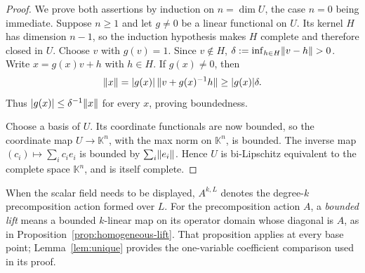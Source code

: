 \begin{proof}
We prove both assertions by induction on $n=\dim U$, the case $n=0$ being immediate. Suppose $n\ge1$ and let $g\ne0$
be a linear functional on $U$. Its kernel $H$ has dimension $n-1$, so the induction hypothesis makes $H$ complete
and therefore closed in $U$. Choose $v$ with $g(v)=1$. Since $v\notin H$,
$\delta:=\inf_{h\in H}\lVert v-h\rVert>0$. Write $x=g(x)v+h$ with $h\in H$. If $g(x)\ne0$, then
\[
\lVert x\rVert=\lvert g(x)\rvert\,\lVert v+g(x)^{-1}h\rVert\ge\lvert g(x)\rvert\delta.
\]
Thus $\lvert g(x)\rvert\le\delta^{-1}\lVert x\rVert$ for every $x$, proving boundedness.

Choose a basis of $U$. Its coordinate functionals are now bounded, so the coordinate map
$U\to\mathbb K^n$, with the max norm on $\mathbb K^n$, is bounded. The inverse map
$(c_i)\mapsto\sum_ic_ie_i$ is bounded by $\sum_i\lVert e_i\rVert$. Hence $U$ is bi-Lipschitz equivalent to the complete
space $\mathbb K^n$, and is itself complete.
\end{proof}

When the scalar field needs to be displayed, $A^{k,L}$ denotes the degree-$k$ precomposition action formed over $L$. For the precomposition action $A$, a \emph{bounded lift} means a bounded $k$\nobreakdash-linear map on its operator domain whose diagonal is $A$, as in Proposition~\ref{prop:homogeneous-lift}. That proposition applies at every base point; Lemma~\ref{lem:unique} provides the one-variable coefficient comparison used in its proof.
